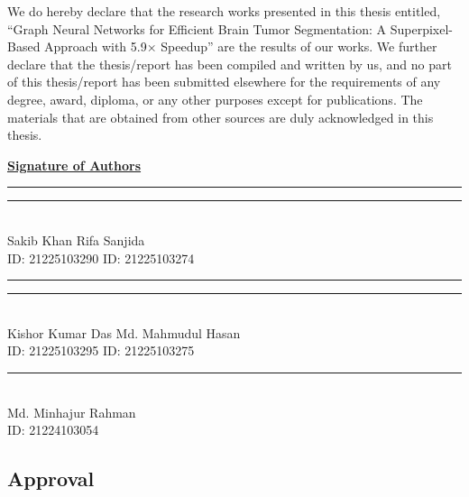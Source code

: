 \documentclass{article}
\begin{document}
We do hereby declare that the research works presented in this thesis entitled, “Graph Neural Networks for Efficient Brain Tumor Segmentation:
A Superpixel-Based Approach with 5.9× Speedup” are the results of our works. We further declare that the thesis/report has been compiled and written by us, and no part of this thesis/report has been submitted elsewhere for the requirements of any degree, award, diploma, or any other purposes except for publications. The materials that are obtained from other sources are duly acknowledged in this thesis.


\vspace{10mm}
\begin{flushleft}

\textbf{\underline{Signature of Authors}} \null\hfill  

\vspace{20mm}

\parbox{6cm}{\centering\rule{6cm}{0.4pt}\vspace{2mm}} \null\hfill 
\parbox{6cm}{\centering\rule{6cm}{0.4pt}\vspace{2mm}}\\
Sakib Khan \null\hfill Rifa Sanjida \\
ID: 21225103290  \null\hfill  ID: 21225103274 \\

\vspace{15mm}

\parbox{6cm}{\centering\rule{6cm}{0.4pt}\vspace{2mm}} \null\hfill 
\parbox{6cm}{\centering\rule{6cm}{0.4pt}\vspace{2mm}}\\
Kishor Kumar Das  \null\hfill   Md. Mahmudul Hasan\\
ID: 21225103295  \null\hfill  ID: 21225103275\\

\vspace{15mm}

\parbox{6cm}{\centering\rule{6cm}{0.4pt}\vspace{2mm}}\\
Md. Minhajur Rahman\\
ID: 21224103054 \\ 
\end{flushleft}
\cleardoublepage

\begin{center}
    \section*{Approval}
\end{center}
\end{document}
